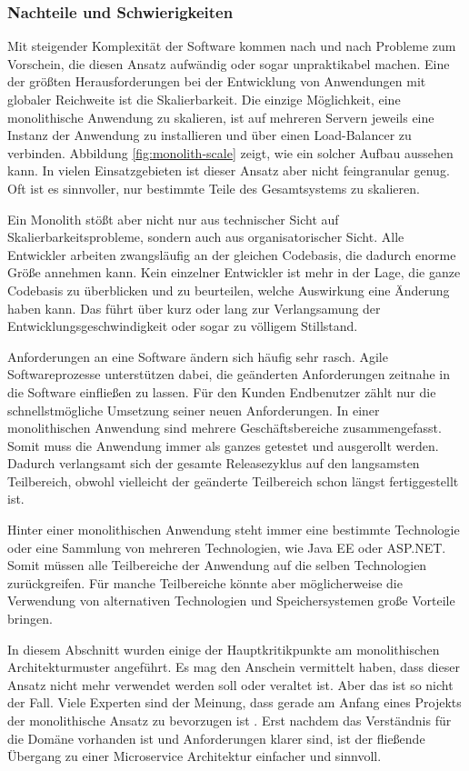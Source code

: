 \subsubsection{Nachteile und Schwierigkeiten}

Mit steigender Komplexität der Software kommen nach und nach Probleme zum Vorschein, die diesen Ansatz aufwändig oder sogar unpraktikabel machen. Eine der größten Herausforderungen bei der Entwicklung von Anwendungen mit globaler Reichweite ist die Skalierbarkeit. Die einzige Möglichkeit, eine monolithische Anwendung zu skalieren, ist auf mehreren Servern jeweils eine Instanz der Anwendung zu installieren und über einen Load-Balancer zu verbinden. Abbildung \ref{fig:monolith-scale} zeigt, wie ein solcher Aufbau aussehen kann. In vielen Einsatzgebieten ist dieser Ansatz aber nicht feingranular genug. Oft ist es sinnvoller, nur bestimmte Teile des Gesamtsystems zu skalieren.

Ein Monolith stößt aber nicht nur aus technischer Sicht auf Skalierbarkeitsprobleme, sondern auch aus organisatorischer Sicht. Alle Entwickler arbeiten zwangsläufig an der gleichen Codebasis, die dadurch enorme Größe annehmen kann. Kein einzelner Entwickler ist mehr in der Lage, die ganze Codebasis zu überblicken und zu beurteilen, welche Auswirkung eine Änderung haben kann. Das führt über kurz oder lang zur Verlangsamung der Entwicklungsgeschwindigkeit oder sogar zu völligem Stillstand.

Anforderungen an eine Software ändern sich häufig sehr rasch. Agile Softwareprozesse unterstützen dabei, die geänderten Anforderungen zeitnahe in die Software einfließen zu lassen. Für den Kunden \bzw Endbenutzer zählt nur die schnellstmögliche Umsetzung seiner neuen Anforderungen. In einer monolithischen Anwendung sind mehrere Geschäftsbereiche zusammengefasst. Somit muss die Anwendung immer als ganzes getestet und ausgerollt werden. Dadurch verlangsamt sich der gesamte Releasezyklus auf den langsamsten Teilbereich, obwohl vielleicht der geänderte Teilbereich schon längst fertiggestellt ist.

Hinter einer monolithischen Anwendung steht immer eine bestimmte Technologie oder eine Sammlung von mehreren Technologien, wie \zB Java EE oder ASP.NET. Somit müssen alle Teilbereiche der Anwendung auf die selben Technologien zurückgreifen. Für manche Teilbereiche könnte aber möglicherweise die Verwendung von alternativen Technologien und Speichersystemen große Vorteile bringen.

In diesem Abschnitt wurden einige der Hauptkritikpunkte am monolithischen Architekturmuster angeführt. Es mag den Anschein vermittelt haben, dass dieser Ansatz nicht mehr verwendet werden soll oder veraltet ist. Aber das ist so nicht der Fall. Viele Experten sind der Meinung, dass gerade am Anfang eines Projekts der monolithische Ansatz zu bevorzugen ist \cite{FowlerMolithFist}. Erst nachdem das Verständnis für die Domäne vorhanden ist und Anforderungen klarer sind, ist der fließende Übergang zu einer Microservice Architektur einfacher und sinnvoll. 

